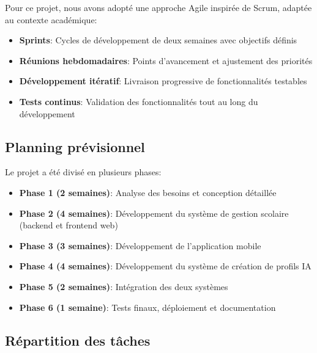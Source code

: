 Pour ce projet, nous avons adopté une approche Agile inspirée de Scrum, adaptée au contexte académique:

\begin{itemize}
  \item \textbf{Sprints}: Cycles de développement de deux semaines avec objectifs définis
  
  \item \textbf{Réunions hebdomadaires}: Points d'avancement et ajustement des priorités
  
  \item \textbf{Développement itératif}: Livraison progressive de fonctionnalités testables
  
  \item \textbf{Tests continus}: Validation des fonctionnalités tout au long du développement
\end{itemize}

\subsection{Planning prévisionnel}

Le projet a été divisé en plusieurs phases:

\begin{itemize}
  \item \textbf{Phase 1 (2 semaines)}: Analyse des besoins et conception détaillée
  
  \item \textbf{Phase 2 (4 semaines)}: Développement du système de gestion scolaire (backend et frontend web)
  
  \item \textbf{Phase 3 (3 semaines)}: Développement de l'application mobile
  
  \item \textbf{Phase 4 (4 semaines)}: Développement du système de création de profils IA
  
  \item \textbf{Phase 5 (2 semaines)}: Intégration des deux systèmes
  
  \item \textbf{Phase 6 (1 semaine)}: Tests finaux, déploiement et documentation
\end{itemize}

\subsection{Répartition des tâches}

